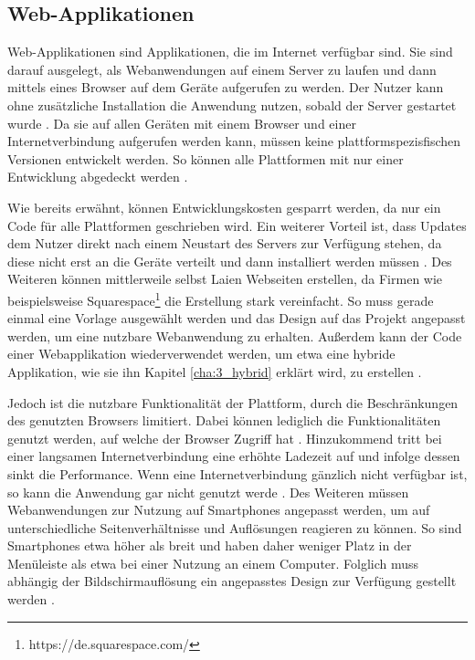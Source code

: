 \subsection{Web-Applikationen}
Web-Applikationen sind Applikationen, die im Internet verfügbar sind. Sie sind darauf ausgelegt, als Webanwendungen auf einem Server zu laufen und dann mittels eines Browser auf dem Geräte aufgerufen zu werden. Der Nutzer kann ohne zusätzliche Installation die Anwendung nutzen, sobald der Server gestartet wurde \cite{IEEE_Khackouch_Al}.
Da sie auf allen Geräten mit einem Browser und einer Internetverbindung aufgerufen werden kann, müssen keine plattformspezisfischen Versionen entwickelt werden.
So können alle Plattformen mit nur einer Entwicklung abgedeckt werden \cite{IEEE_development_classes}.

Wie bereits erwähnt, können Entwicklungskosten gesparrt werden, da nur ein Code für alle Plattformen geschrieben wird. Ein weiterer Vorteil ist, dass Updates dem Nutzer direkt nach einem Neustart des Servers zur Verfügung stehen, da diese nicht erst an die Geräte verteilt und dann installiert werden müssen \cite{IEEE_Khackouch_Al}. Des Weiteren können mittlerweile selbst Laien Webseiten erstellen, da Firmen wie beispielsweise Squarespace\footnote{https://de.squarespace.com/} die Erstellung stark vereinfacht. So muss gerade einmal eine Vorlage ausgewählt werden und das Design auf das Projekt angepasst werden, um eine nutzbare Webanwendung zu erhalten. 
Außerdem kann der Code einer Webapplikation wiederverwendet werden, um etwa eine hybride Applikation, wie sie ihn Kapitel \ref{cha:3_hybrid} erklärt wird, zu erstellen \cite{IEEE_Khackouch_Al}. 

Jedoch ist die nutzbare Funktionalität der Plattform, durch die Beschränkungen des genutzten Browsers limitiert. Dabei können lediglich die Funktionalitäten genutzt werden, auf welche der Browser Zugriff hat \cite{Phyo}. Hinzukommend tritt bei einer langsamen Internetverbindung eine erhöhte Ladezeit auf und infolge dessen sinkt die Performance. Wenn eine Internetverbindung gänzlich nicht verfügbar ist, so kann die Anwendung gar nicht genutzt werde \cite{IEEE_Khackouch_Al}. Des Weiteren müssen Webanwendungen zur Nutzung auf Smartphones angepasst werden, um auf unterschiedliche Seitenverhältnisse und Auflösungen reagieren zu können. So sind Smartphones etwa höher als breit und haben daher weniger Platz in der Menüleiste als etwa bei einer Nutzung an einem Computer. Folglich muss abhängig der Bildschirmauflösung ein angepasstes Design zur Verfügung gestellt werden \cite{Serrano_mobile}.

